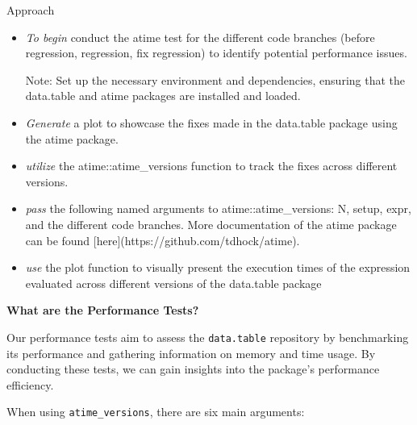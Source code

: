 \noindent Approach

\begin{itemize}
    

\item \textit{To begin} conduct the atime test for the different code branches (before regression, regression, fix regression) to identify potential performance issues. 
\vspace{0.1in}

\noindent Note: Set up the necessary environment and dependencies, ensuring that the data.table and atime packages are installed and loaded.
\vspace{0.1in}

\item \textit{Generate} a plot to showcase the fixes made in the data.table package using the atime package.

\vspace{0.1in}
\item \textit{utilize} the atime::atime\_versions function to track the fixes across different versions.
\vspace{0.1in}

\item \textit{pass} the following named arguments to atime::atime\_versions: N, setup, expr, and the different code branches. More documentation of the atime package can be found [here](https://github.com/tdhock/atime). 
\vspace{0.1in}

\item \textit{use} the plot function to visually present the execution times of the expression evaluated across different versions of the data.table package

\end{itemize}

\textbf{What are the Performance Tests?}

Our  performance tests aim to assess the \texttt{data.table} repository by benchmarking its performance and gathering information on memory and time usage. By conducting these tests, we can gain insights into the package’s performance efficiency.

When using \texttt{atime\_versions}, there are six main arguments:

